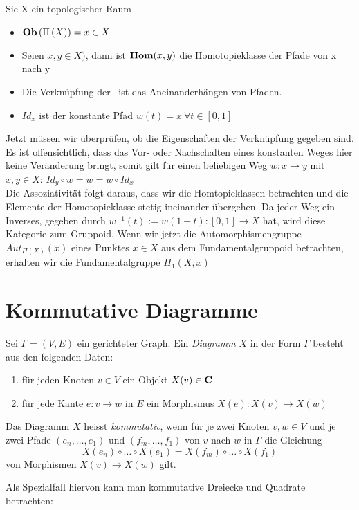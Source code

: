 \documentclass{article}
\renewcommand{\id}{\ensuremath{Id}}
\begin{document}
		\begin{bsp}[Fundamentalgruppoid]
		 	\cite[Aufgabe 2.24 ]{Bra}
		 	Sie X ein topologischer Raum
		\begin{itemize}
			\item \( \mathbf{Ob}  \left( \Pi \left( X \right) \right) = x \in X \)
			\item Seien \( x ,y \in X ) \), dann ist \(  \mathbf{Hom } (x,y) \) die Homotopieklasse der Pfade von x nach y
			\item Die Verkn\"upfung der \Hom \ ist das Aneinanderh\"angen von Pfaden.
			\item \(  \id_x \) ist der konstante Pfad \( w(t)=x \ \forall t \in [0,1] \)
		\end{itemize}
		Jetzt m\"ussen wir \"uberpr\"ufen, ob die Eigenschaften der Verkn\"upfung gegeben sind.
		Es ist offensichtlich, dass das Vor- oder Nachschalten eines konstanten Weges hier keine Ver\"anderung bringt, somit gilt f\"ur einen beliebigen Weg 
		\(w:x \to y \) mit \( x,y \in X\):
		\( \id_y \circ w = w = w \circ \id_x \) \\
		Die Assoziativit\"at folgt daraus, dass wir die Homtopieklassen betrachten und die Elemente der Homotopieklasse stetig ineinander \"ubergehen.
		Da jeder Weg ein Inverses, gegeben durch \( w^{-1}(t):=w(1-t): [0,1] \to X \) hat, wird diese Kategorie zum Gruppoid.
		Wenn wir jetzt die Automorphismengruppe \( Aut_{\Pi(X)}(x) \) eines Punktes \(x \in X \) aus dem Fundamentalgruppoid betrachten, erhalten wir die Fundamentalgruppe \( \Pi_1(X,x) \) \cite[Beispiel 2.3.14-(8)]{Bra}
		\end{bsp}
	
	\section{Kommutative Diagramme}
		\begin{defi}
		 \cite[Definition 2.4.3]{Bra}
		Sei \( \Gamma =(V,E) \) ein gerichteter Graph. Ein  \emph{Diagramm} $X$ in der Form \( \Gamma \) besteht aus den folgenden Daten:
		\begin{enumerate}
			\item f\"ur jeden Knoten \( v \in V \) ein  Objekt \( X(v) \in \mathbf{C} \)
			\item f\"ur jede Kante \( e:v \to w \) in \( E \) ein Morphismus \( X(e):X(v) \to X(w) \)  
		\end{enumerate}
		Das Diagramm $X$ heisst \emph{kommutativ}, wenn f\"ur je zwei Knoten \(v,w \in V \) und je zwei Pfade \( \left(e_n, \dots ,e_1\right) \) und \( \left(f_m, \dots ,f_1\right) \) von $v $ nach $w$ in $\Gamma $ die Gleichung 
		\[
			X(e_n) \circ \dots \circ X(e_1) = X(f_m) \circ \dots \circ X(f_1)
		\]
		von Morphismen \( X(v) \to X(w) \) gilt.
		
		Als Spezialfall hiervon kann man kommutative Dreiecke und Quadrate betrachten:\\
 		 
			
		\end{defi}
			 
\end{document}
